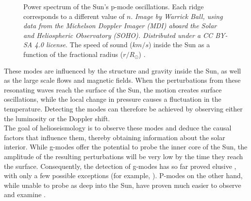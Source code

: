 \documentclass[11pt,a4paper,onecolumn]{report}
\begin{document}
\begin{figure}[t]
  \centering
   \caption{ Power spectrum of the Sun's p-mode
  oscillations. Each ridge corresponds to a different value of \(n\).
  \textit{Image by Warrick Ball, using data from the Michelson Doppler Imager
  (MDI) aboard the Solar and Heliospheric Observatory (SOHO). Distributed under
  a CC BY-SA 4.0 license}.  The speed of sound
  (\(\si{km\per s}\)) inside the Sun as a function of the fractional radius
  (\(\si{r \per R_\odot}\)) \citep{bahcall_solar_2000}.}

\end{figure}

These modes are influenced by the structure and gravity inside the Sun, as well
as the large scale flows and magnetic fields. When the perturbations from these
resonating waves reach the surface of the Sun, the motion creates surface
oscillations, while the local change in pressure causes a fluctuation in the
temperature. Detecting the modes can therefore be achieved by observing either the
luminosity or the Doppler shift.\\

The goal of helioseismology is to observe these modes and deduce the causal
factors that influence them, thereby obtaining information about the solar
interior. While g-modes offer the potential to probe the inner core of the Sun,
the amplitude of the resulting perturbations will be very low by the time they
reach the surface. Consequently, the detection of g-modes has so far proved
elusive \citep{appourchaux_quest_2010}, with only a few possible exceptions (for
example, \citealp{fossat_asymptotic_2017}). P-modes on the other hand, while
unable to probe as deep into the Sun, have proven much easier to observe and
examine \citep{deubner_observations_1975}. \\
\end{document}
